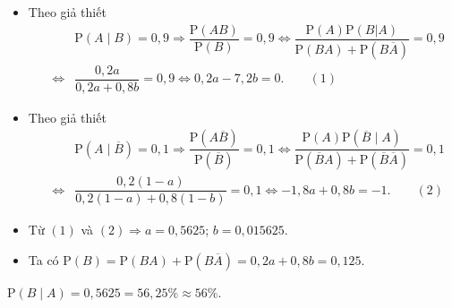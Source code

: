 \begin{ex}
{\begin{itemchoice}
\begin{itemize}
				\item Theo giả thiết 
				\begin{eqnarray*}
					&&\mathrm{P}\left(A\mid B\right)=0{,}9\Rightarrow\dfrac{\mathrm{P}\left(AB\right)}{\mathrm{P}\left(B\right)}=0{,}9\Leftrightarrow\dfrac{\mathrm{P}\left(A\right)\mathrm{P}\left(B|A\right)}{\mathrm{P}\left(BA\right)+\mathrm{P}\left(B\overline{A}\right)}=0{,}9\\
					&\Leftrightarrow&\dfrac{0{,}2a}{0{,}2a+0{,}8b}=0{,}9
					\Leftrightarrow 0{,}2a-7{,}2b=0.\qquad (1)
				\end{eqnarray*}
				\item Theo giả thiết
				\begin{eqnarray*}
					&&\mathrm{P}\left(A\mid\overline{B}\right)=0{,}1\Rightarrow\dfrac{\mathrm{P}\left(A\overline{B}\right)}{\mathrm{P}\left(\overline{B}\right)}=0{,}1\Leftrightarrow\dfrac{\mathrm{P}\left(A\right)\mathrm{P}\left(\overline{B}\mid A\right)}{\mathrm{P}\left(\overline{B}A\right)+\mathrm{P}\left(\overline{B}\overline{A}\right)}=0{,}1\\ &\Leftrightarrow&\dfrac{0{,}2\left(1-a\right)}{0{,}2\left(1-a\right)+0{,}8\left(1-b\right)}=0{,}1\Leftrightarrow-1{,}8a+0{,}8b=-1.\qquad (2) 
				\end{eqnarray*}
				\item Từ $(1)$ và $(2) \Rightarrow a=0{,}5625$; $b=0{,}015625$.
				\item Ta có $ \mathrm{P}\left(B\right)=\mathrm{P}\left(BA\right)+\mathrm{P}\left(B\overline{A}\right)=0{,}2a+0{,}8b=0{,}125$.
			\end{itemize}
			\itemch $\mathrm{P}\left(B\mid A\right)=0{,}5625=56{,}25\%\approx 56\%$.
	\end{itemchoice}}
\end{ex}

